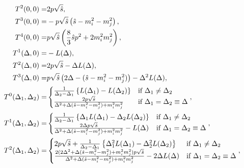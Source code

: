 \documentclass[../main.tex]{subfiles}
\begin{document}
\begin{subequations}
  \begin{align}
    T^2(0, 0) =                         & 2p\sqrt{\hat{s}},
    \\
    T^3(0, 0) =                         &
    -p\sqrt{\hat{s}}\left(\hat{s} - m_i^2 - m_j^2\right),
    \\
    T^4(0, 0) =                         & p\sqrt{\hat{s}}
    \left(\frac{8}{3}\hat{s}p^2 + 2m_i^2m_j^2\right),
    \\
    T^1\!\left(\Delta, 0\right) =          & -L(\Delta),
    \\
    T^2\!\left(\Delta, 0\right) =          & 2p\sqrt{\hat{s}} - \Delta L(\Delta),
    \\
    T^3\!\left(\Delta, 0\right) =          &
    p\sqrt{\hat{s}} \left(2\Delta - (\hat{s}-m_i^2-m_j^2)\right) - \Delta^2 L(\Delta),
    \\
    T^0\!\left(\Delta_1, \Delta_2\right) = & \begin{cases} \frac{1}{\Delta_2 - \Delta_1}
                                            \left\{L(\Delta_1) - L(\Delta_2)\right\}                                           & \text{if } \Delta_1\neq \Delta_2             \\
                                            \frac{2p \sqrt{\hat{s}}}{\Delta^2 + \Delta(\hat{s}-m_i^2-m_j^2) + m_i^2m_j^2} & \text{if } \Delta_1 = \Delta_2 \equiv \Delta\end{cases},
    \\
    T^1\!\left(\Delta_1, \Delta_2\right) = & \begin{cases} \frac{1}{\Delta_2 - \Delta_1}
                                            \left\{\Delta_1 L(\Delta_1) - \Delta_2 L(\Delta_2)\right\}                                            & \text{if } \Delta_1 \neq \Delta_2            \\
                                            \frac{2\Delta p \sqrt{\hat{s}}}{\Delta^2 + \Delta(\hat{s}-m_i^2-m_j^2) + m_i^2m_j^2} - L(\Delta) & \text{if } \Delta_1 = \Delta_2 \equiv \Delta\end{cases},
    \\
    \nonumber
    T^2\!\left(\Delta_1, \Delta_2\right) = & \begin{cases} 2p\sqrt{\hat{s}} +
                                            \frac{1}{\Delta_2 - \Delta_1} \left\{\Delta_1^2 L(\Delta_1) -
                                            \Delta_2^2 L(\Delta_2)\right\}                                                                                                                                  & \text{if } \Delta_1 \neq \Delta_2            \\
                                            \frac{2(2\Delta^2 + \Delta(\hat{s}-m_i^2-m_j^2) + m_i^2m_j^2) p \sqrt{\hat{s}}}{\Delta^2 + \Delta(\hat{s}-m_i^2-m_j^2) + m_i^2m_j^2} - 2\Delta L(\Delta) & \text{if } \Delta_1 = \Delta_2 \equiv \Delta\end{cases},
  \end{align}
\end{subequations}
\end{document}
